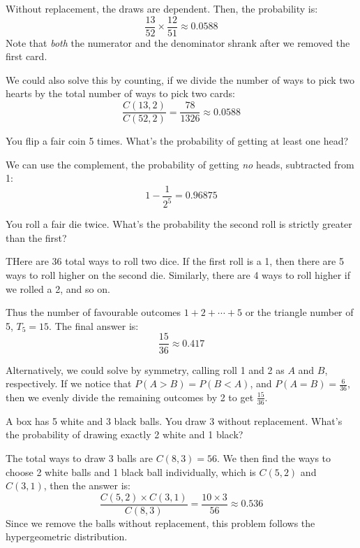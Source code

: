 \begin{solution}
Without replacement, the draws are dependent. Then, the probability is:
\[
\frac{13}{52} \times \frac{12}{51} \approx 0.0588
\]
Note that \textit{both} the numerator and the denominator shrank after we removed the first card.

We could also solve this by counting, if we divide the number of ways to pick two hearts by the total number of ways to pick two cards:
\[
\frac{C(13,2)}{C(52,2)} = \frac{78}{1326} \approx 0.0588
\]
\end{solution}

\begin{problem}
You flip a fair coin 5 times. What's the probability of getting at least one head?
\end{problem}

\begin{solution}
We can use the complement, the probability of getting \textit{no} heads, subtracted from 1:
\[
1 - \frac{1}{2^5} = 0.96875
\]
\end{solution}

\begin{problem}
You roll a fair die twice. What's the probability the second roll is strictly greater than the first?
\end{problem}

\begin{solution}
THere are 36 total ways to roll two dice. If the first roll is a 1, then there are 5 ways to roll higher on the second die. Similarly, there are 4 ways to roll higher if we rolled a 2, and so on.

Thus the number of favourable outcomes $1 + 2 + \cdots + 5$ or the triangle number of 5, $T_5 = 15$. The final answer is:
\[
\frac{15}{36} \approx 0.417
\]

Alternatively, we could solve by symmetry, calling roll 1 and 2 as $A$ and $B$, respectively. If we notice that $P(A > B) = P(B < A)$, and $P(A = B) = \frac{6}{36}$, then we evenly divide the remaining outcomes by 2 to get $\frac{15}{36}$.
\end{solution}

\begin{problem}
A box has 5 white and 3 black balls. You draw 3 without replacement. What's the probability of drawing exactly 2 white and 1 black?
\end{problem}

\begin{solution}
The total ways to draw 3 balls are $C(8, 3) = 56$. We then find the ways to choose 2 white balls and 1 black ball individually, which is $C(5,2)$ and $C(3, 1)$, then the answer is:
\[
\frac{C(5,2)\times C(3,1)}{C(8,3)} = \frac{10 \times 3}{56} \approx 0.536
\]
Since we remove the balls without replacement, this problem follows the hypergeometric distribution.
\end{solution}

